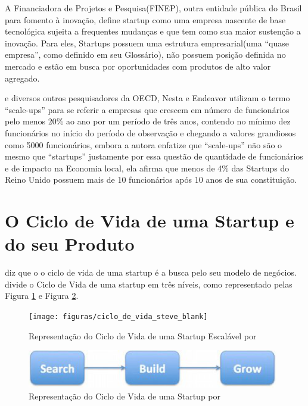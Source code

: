 A Financiadora de Projetos e Pesquisa(FINEP), outra entidade pública do Brasil para fomento à inovação, define startup como uma empresa nascente de base tecnológica sujeita a frequentes mudanças e que tem como sua maior sustenção a inovação. Para eles, Startups possuem uma estrutura empresarial(uma ``quase empresa'', como definido em seu Glossário), não possuem posição definida no mercado e estão em busca por oportunidades com produtos de alto valor agregado.

 e diversos outros pesquisadores da OECD, Nesta e Endeavor utilizam o termo ``scale-ups'' para se referir a empresas que crescem em número de funcionários pelo menos 20\% ao ano por um período de três anos, contendo no mínimo dez funcionários no início do período de observação e chegando a valores grandiosos como 5000 funcionários, embora a autora enfatize que ``scale-ups'' não são o mesmo que ``startups'' justamente por essa questão de quantidade de funcionários e de impacto na Economia local, ela afirma que menos de 4\% das Startups do Reino Unido possuem mais de 10 funcionários após 10 anos de sua constituição.

\section{O Ciclo de Vida de uma Startup e do seu Produto}
\label{section:o_ciclo_de_vida}

 diz que o o ciclo de vida de uma startup é a busca pelo seu modelo de negócios.  divide o Ciclo de Vida de uma startup em três níveis, como representado pelas Figura \ref{figure:ciclo_de_vida_steve_blank} e Figura \ref{figure:ciclo_de_vida_steve_blank_02}.

\begin{figure}[!htb]
\centering
\texttt{[image: figuras/ciclo\_de\_vida\_steve\_blank]}
\caption{Representação do Ciclo de Vida de uma Startup Escalável por \cite{Blank2014}}
\label{figure:ciclo_de_vida_steve_blank}
\end{figure}

\begin{figure}[!htb]
\centering
\includegraphics[width=11cm,angle=0]{figuras/ciclo_de_vida_steve_blank02}
\caption{Representação do Ciclo de Vida de uma Startup por \cite{Blank2015}}
\label{figure:ciclo_de_vida_steve_blank_02}
\end{figure}

